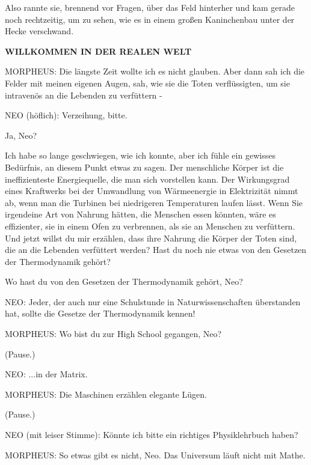 Also rannte sie, brennend vor Fragen, über das Feld hinterher und kam gerade
noch rechtzeitig, um zu sehen, wie es in einem großen Kaninchenbau unter der
Hecke verschwand.

\textbf{WILLKOMMEN IN DER REALEN WELT}

MORPHEUS: Die längste Zeit wollte ich es nicht glauben. Aber dann sah ich die
Felder mit meinen eigenen Augen, sah, wie sie die Toten verflüssigten, um sie
intravenös an die Lebenden zu verfüttern -

NEO (höflich): Verzeihung, bitte.

Ja, Neo?

Ich habe so lange geschwiegen, wie ich konnte, aber ich fühle ein gewisses
Bedürfnis, an diesem Punkt etwas zu sagen. Der menschliche Körper ist die
ineffizienteste Energiequelle, die man sich vorstellen kann. Der Wirkungsgrad
eines Kraftwerks bei der Umwandlung von Wärmeenergie in Elektrizität nimmt ab,
wenn man die Turbinen bei niedrigeren Temperaturen laufen lässt. Wenn Sie
irgendeine Art von Nahrung hätten, die Menschen essen könnten, wäre es
effizienter, sie in einem Ofen zu verbrennen, als sie an Menschen zu verfüttern.
Und jetzt willst du mir erzählen, dass ihre Nahrung die Körper der Toten sind,
die an die Lebenden verfüttert werden? Hast du noch nie etwas von den Gesetzen
der Thermodynamik gehört?

Wo hast du von den Gesetzen der Thermodynamik gehört, Neo?

NEO: Jeder, der auch nur eine Schulstunde in Naturwissenschaften überstanden
hat, sollte die Gesetze der Thermodynamik kennen!

MORPHEUS: Wo bist du zur High School gegangen, Neo?

(Pause.)

NEO: ...in der Matrix.

MORPHEUS: Die Maschinen erzählen elegante Lügen.

(Pause.)

NEO (mit leiser Stimme): Könnte ich bitte ein richtiges Physiklehrbuch haben?

MORPHEUS: So etwas gibt es nicht, Neo. Das Universum läuft nicht mit Mathe.

